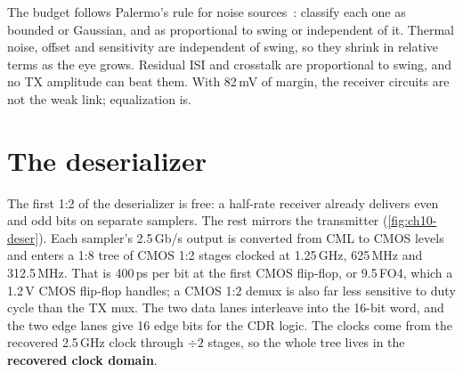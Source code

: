 The budget follows Palermo's rule for noise sources~\cite{palermo720ckt}: classify each one as bounded or Gaussian, and as proportional to swing or independent of it. Thermal noise, offset and sensitivity are independent of swing, so they shrink in relative terms as the eye grows. Residual ISI and crosstalk are proportional to swing, and no TX amplitude can beat them. With 82\,mV of margin, the receiver circuits are not the weak link; equalization is.

\section{The deserializer}\label{sec:deserializer}

The first 1:2 of the deserializer is free: a half-rate receiver already delivers even and odd bits on separate samplers. The rest mirrors the transmitter (\cref{fig:ch10-deser}). Each sampler's 2.5\,Gb/s output is converted from CML to CMOS levels and enters a 1:8 tree of CMOS 1:2 stages clocked at 1.25\,GHz, 625\,MHz and 312.5\,MHz. That is 400\,ps per bit at the first CMOS flip-flop, or 9.5\,FO4, which a 1.2\,V CMOS flip-flop handles; a CMOS 1:2 demux is also far less sensitive to duty cycle than the TX mux. The two data lanes interleave into the 16-bit word, and the two edge lanes give 16 edge bits for the CDR logic. The clocks come from the recovered 2.5\,GHz clock through $\div2$ stages, so the whole tree lives in the \textbf{recovered clock domain}.

